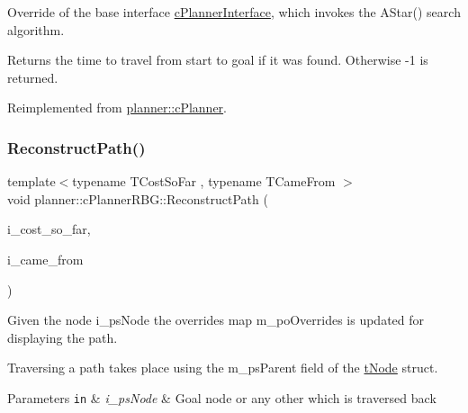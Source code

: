 Override of the base interface \mbox{\hyperlink{classplanner_1_1c_planner_interface}{c\+Planner\+Interface}}, which invokes the A\+Star() search algorithm. 

\begin{DoxyReturn}{Returns}
the time to travel from start to goal if it was found. Otherwise -\/1 is returned. 
\end{DoxyReturn}


Reimplemented from \mbox{\hyperlink{classplanner_1_1c_planner_a21230c015260b9fc34ad2f239592470e}{planner\+::c\+Planner}}.

\mbox{\label{classplanner_1_1c_planner_r_b_g_a1af74d398b286f1e05e6ade495efbbd0}} 
\subsubsection{\texorpdfstring{Reconstruct\+Path()}{ReconstructPath()}\hspace{0.1cm}{\footnotesize\ttfamily [1/2]}}
{\footnotesize\ttfamily template$<$typename T\+Cost\+So\+Far , typename T\+Came\+From $>$ \\
void planner\+::c\+Planner\+R\+B\+G\+::\+Reconstruct\+Path (\begin{DoxyParamCaption}\item[{T\+Cost\+So\+Far \&\&}]{i\+\_\+cost\+\_\+so\+\_\+far,  }\item[{T\+Came\+From \&\&}]{i\+\_\+came\+\_\+from }\end{DoxyParamCaption})}



Given the node i\+\_\+ps\+Node the overrides map m\+\_\+po\+Overrides is updated for displaying the path. 

Traversing a path takes place using the m\+\_\+ps\+Parent field of the \mbox{\hyperlink{structplanner_1_1t_node}{t\+Node}} struct. 
\begin{DoxyParams}[1]{Parameters}
\mbox{\tt in}  & {\em i\+\_\+ps\+Node} & Goal node or any other which is traversed back \\
\hline
\end{DoxyParams}
\mbox{\label{classplanner_1_1c_planner_r_b_g_a1af74d398b286f1e05e6ade495efbbd0}} 
